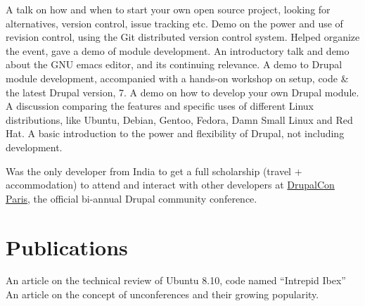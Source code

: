 \documentclass[11pt,a4paper]{moderncv}
\begin{document}
{A talk on how and when to start your own open source project, looking for alternatives, version control, issue tracking etc.}
{Demo on the power and use of revision control, using the Git distributed version control system.}
{Helped organize the event, gave a demo of module development.}
{An introductory talk and demo about the GNU emacs editor, and its continuing relevance.}
{A demo to Drupal module development, accompanied with a hands-on workshop on setup, code \& the latest Drupal version, 7.}
{A demo on how to develop your own Drupal module.}
{A discussion comparing the features and specific uses of different Linux distributions, like Ubuntu, Debian, Gentoo, Fedora, Damn Small Linux and Red Hat.}
{A basic introduction to the power and flexibility of Drupal, not including development.\\}

{Was the only developer from India to get a full scholarship (travel + accommodation) to attend and interact with other developers at \href{http://paris2009.drupalcon.org}{DrupalCon Paris}, the official bi-annual Drupal community conference.}


\section{Publications}
{An article on the technical review of Ubuntu 8.10, code named ``Intrepid Ibex''}
{An article on the concept of unconferences and their growing popularity.}

\end{document}
